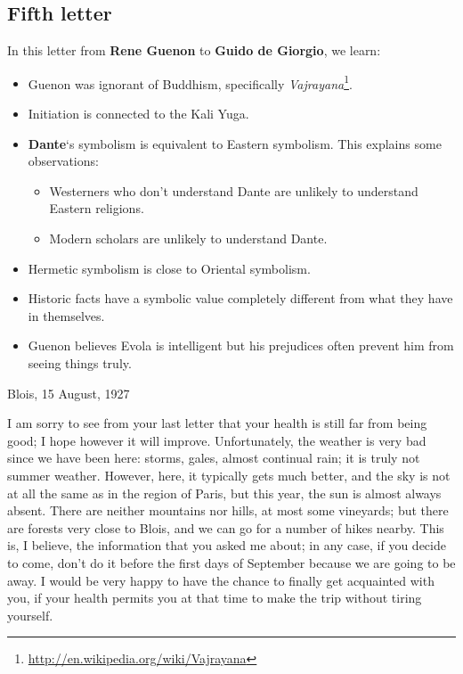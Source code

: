 \subsection{Fifth letter}

\begin{quotex}
In this letter from \textbf{Rene Guenon} to\textbf{ Guido de Giorgio}, we learn:

\begin{itemize}
\item
Guenon was ignorant of Buddhism, specifically \emph{Vajrayana}\footnote{\url{http://en.wikipedia.org/wiki/Vajrayana}}. 
\item 
Initiation is connected to the Kali Yuga. 
\item
\textbf{Dante}`s symbolism is equivalent to Eastern symbolism. This explains some observations: 

\begin{itemize}
\item
Westerners who don't understand Dante are unlikely to understand Eastern religions. 
\item 
Modern scholars are unlikely to understand Dante. 
\end{itemize}
\item 
Hermetic symbolism is close to Oriental symbolism. 
\item
Historic facts have a symbolic value completely different from what they have in themselves. 
\item
Guenon believes Evola is intelligent but his prejudices often prevent him from seeing things truly. 
\end{itemize}
\end{quotex}

Blois, 15 August, 1927

I am sorry to see from your last letter that your health is still far from being good; I hope however it will improve. Unfortunately, the weather is very bad since we have been here: storms, gales, almost continual rain; it is truly not summer weather. However, here, it typically gets much better, and the sky is not at all the same as in the region of Paris, but this year, the sun is almost always absent. There are neither mountains nor hills, at most some vineyards; but there are forests very close to Blois, and we can go for a number of hikes nearby. This is, I believe, the information that you asked me about; in any case, if you decide to come, don't do it before the first days of September because we are going to be away. I would be very happy to have the chance to finally get acquainted with you, if your health permits you at that time to make the trip without tiring yourself.

